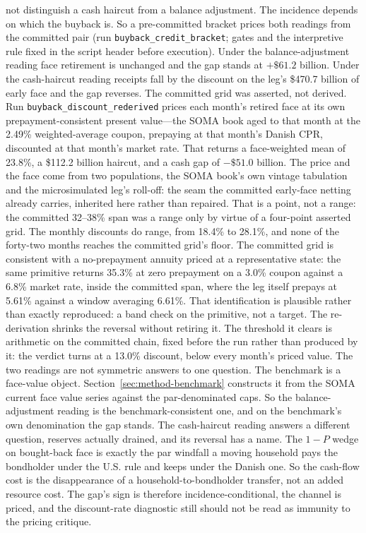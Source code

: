 \documentclass[12pt]{article}
\begin{document}
not distinguish a cash haircut from a balance adjustment. The incidence depends on which the buyback is. So a pre-committed bracket prices both readings from the committed pair (run \texttt{buyback\_credit\_bracket}; gates and the interpretive rule fixed in the script header before execution). Under the balance-adjustment reading face retirement is unchanged and the gap stands at $+\$61.2$ billion. Under the cash-haircut reading receipts fall by the discount on the leg's \$470.7 billion of early face and the gap reverses. The committed grid was asserted, not derived. Run \texttt{buyback\_discount\_rederived} prices each month's retired face at its own prepayment-consistent present value---the SOMA book aged to that month at the 2.49\% weighted-average coupon, prepaying at that month's Danish CPR, discounted at that month's market rate. That returns a face-weighted mean of 23.8\%, a \$112.2 billion haircut, and a cash gap of $-\$51.0$ billion. The price and the face come from two populations, the SOMA book's own vintage tabulation and the microsimulated leg's roll-off: the seam the committed early-face netting already carries, inherited here rather than repaired. That is a point, not a range: the committed 32--38\% span was a range only by virtue of a four-point asserted grid. The monthly discounts do range, from 18.4\% to 28.1\%, and none of the forty-two months reaches the committed grid's floor. The committed grid is consistent with a no-prepayment annuity priced at a representative state: the same primitive returns 35.3\% at zero prepayment on a 3.0\% coupon against a 6.8\% market rate, inside the committed span, where the leg itself prepays at 5.61\% against a window averaging 6.61\%. That identification is plausible rather than exactly reproduced: a band check on the primitive, not a target. The re-derivation shrinks the reversal without retiring it. The threshold it clears is arithmetic on the committed chain, fixed before the run rather than produced by it: the verdict turns at a 13.0\% discount, below every month's priced value. The two readings are not symmetric answers to one question. The benchmark is a face-value object. Section~\ref{sec:method-benchmark} constructs it from the SOMA current face value series against the par-denominated caps. So the balance-adjustment reading is the benchmark-consistent one, and on the benchmark's own denomination the gap stands. The cash-haircut reading answers a different question, reserves actually drained, and its reversal has a name. The $1-P$ wedge on bought-back face is exactly the par windfall a moving household pays the bondholder under the U.S. rule and keeps under the Danish one. So the cash-flow cost is the disappearance of a household-to-bondholder transfer, not an added resource cost. The gap's sign is therefore incidence-conditional, the channel is priced, and the discount-rate diagnostic still should not be read as immunity to the pricing critique.
\end{document}
